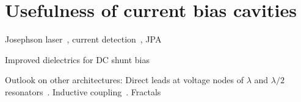 \section{Usefulness of current bias cavities}

Josephson laser~\cite{chenRealizationSingleCooperpairJosephson2014c,cassidyDemonstrationAcJosephson2017e}, current detection~\cite{kherKineticInductanceParametric2016,kherSuperconductingNonlinearKinetic2017}, JPA~\cite{hoeomWidebandLownoiseSuperconducting2012d}

Improved dielectrics for DC shunt bias~\cite{adamyanTunableSuperconductingMicrostrip2016}

Outlook on other architectures:
%
Direct leads at voltage nodes of $\lambda$ and $\lambda/2$ resonators~\cite{chenIntroductionDcBias2011a,liApplyingDirectCurrent2013}.
%
Inductive coupling~\cite{vissersFrequencytunableSuperconductingResonators2015b}.
%
Fractals~\cite{mahashabdeFastTunableHigh2020}

